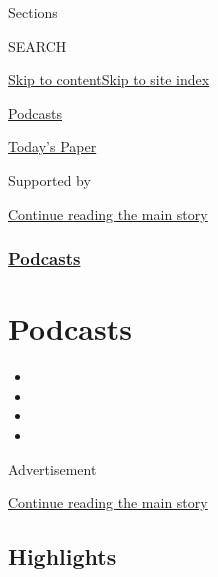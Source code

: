 Sections

SEARCH

\protect\hyperlink{site-content}{Skip to
content}\protect\hyperlink{site-index}{Skip to site index}

\href{https://www.nytimes3xbfgragh.onion/spotlight/podcasts}{Podcasts}

\href{https://myaccount.nytimes3xbfgragh.onion/auth/login?response_type=cookie\&client_id=vi}{}

\href{https://www.nytimes3xbfgragh.onion/section/todayspaper}{Today's
Paper}

Supported by

\protect\hyperlink{after-sponsor}{Continue reading the main story}

\hypertarget{podcasts}{%
\subsubsection{\texorpdfstring{\href{/spotlight/podcasts}{Podcasts}}{Podcasts}}\label{podcasts}}

\hypertarget{podcasts-1}{%
\section{Podcasts}\label{podcasts-1}}

\begin{itemize}
\item
\item
\item
\item
\end{itemize}

Advertisement

\protect\hyperlink{after-subheader}{Continue reading the main story}

\hypertarget{highlights}{%
\subsection{Highlights}\label{highlights}}


